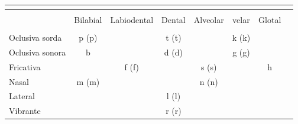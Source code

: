 \documentclass[convert={density=300,size=1080x800,outext=.png}]{standalone}
\begin{document}
{\Large{
	\begin{tabular}{@{}lccccccc@{}}
	\multicolumn{7}{c}{\phantom{Consonantes}}\\ [1ex]
	\hline\\[-1.5ex]
	& {\sc Bilabial} & {\sc Labiodental} & {\sc Dental} & {\sc Alveolar} & {\sc velar} & {\sc Glotal} \\[1ex]
	\hline\\[-1.5ex]
	{\sc Oclusiva sorda} & p (p) &  & t (t) & & k (k) & \\ [1ex]
	{\sc Oclusiva sonora} & b & & d (d) & & g (g) & \\ [1ex]
	{\sc Fricativa} & & f (f) & & s (s) & & h \\ [1ex]
	{\sc Nasal} & m (m) & & & n (n) & & \\ [1ex]
	{\sc Lateral} & & & l (l) & & & \\ [1ex]
	{\sc Vibrante} & & & r (r) & & \\ [1ex]
	\hline
	\end{tabular}
}}
\end{document}
